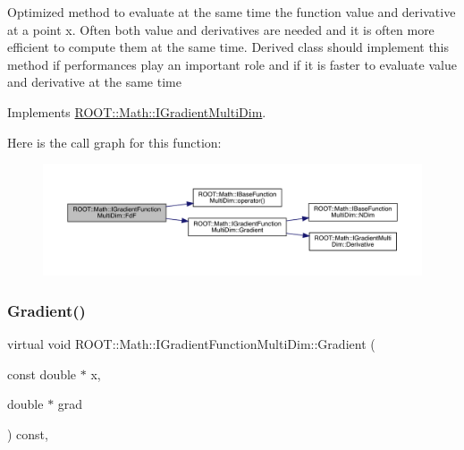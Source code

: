 Optimized method to evaluate at the same time the function value and derivative at a point x. Often both value and derivatives are needed and it is often more efficient to compute them at the same time. Derived class should implement this method if performances play an important role and if it is faster to evaluate value and derivative at the same time 

Implements \mbox{\hyperlink{classROOT_1_1Math_1_1IGradientMultiDim_ad8d0e31b786327014524483a708d8f82}{R\+O\+O\+T\+::\+Math\+::\+I\+Gradient\+Multi\+Dim}}.

Here is the call graph for this function\+:
\nopagebreak
\begin{figure}[H]
\begin{center}
\leavevmode
\includegraphics[width=350pt]{da/d1a/classROOT_1_1Math_1_1IGradientFunctionMultiDim_a58cefd2806ec7b9d389911800ed60386_cgraph}
\end{center}
\end{figure}
\mbox{\label{classROOT_1_1Math_1_1IGradientFunctionMultiDim_ab65a713d2637c69b334d2119ef4f0e26}} 
\subsubsection{\texorpdfstring{Gradient()}{Gradient()}\hspace{0.1cm}{\footnotesize\ttfamily [1/3]}}
{\footnotesize\ttfamily virtual void R\+O\+O\+T\+::\+Math\+::\+I\+Gradient\+Function\+Multi\+Dim\+::\+Gradient (\begin{DoxyParamCaption}\item[{const double $\ast$}]{x,  }\item[{double $\ast$}]{grad }\end{DoxyParamCaption}) const\hspace{0.3cm}{\ttfamily [inline]}, {\ttfamily [virtual]}}

